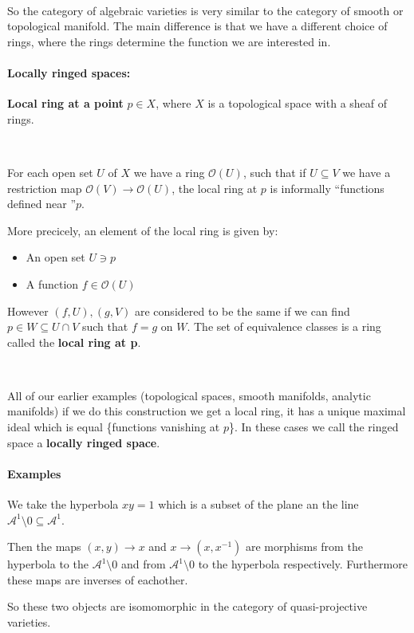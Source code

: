 \

So the category of algebraic varieties is very similar to the category of smooth or topological manifold. The main difference is that we have a different choice of rings, where the rings determine the function we are interested in.

\paragraph*{Locally ringed spaces:}
\begin{definition}
    \textbf{Local ring at a point }$p\in X$, where $X$ is a topological space with a sheaf of rings.

    \

    For each open set $U$ of $X$ we have a ring $\mathcal{O}(U)$, such that if $U\subseteq V$ we have a restriction map $\mathcal{O}(V)\rightarrow \mathcal{O}(U)$, the local ring at $p$ is informally ``functions defined near ''$p$. 

    More precicely, an element of the local ring is given by:\begin{itemize}
        \item An open set $U\ni p$
        \item A function $f\in \mathcal{O}(U)$
    \end{itemize}

    However $(f,U),(g,V)$ are considered to be the same if we can find $p\in W\subseteq U\cap V$ such that $f = g$ on $W$. The set of equivalence classes is a ring called the \textbf{local ring at p}.
\end{definition}

\

All of our earlier examples (topological spaces, smooth manifolds, analytic manifolds) if we do this construction we get a local ring, it has a unique maximal ideal which is equal \{functions vanishing at $p$\}. In these cases we call the ringed space a \textbf{locally ringed space}.

\paragraph*{Examples}

\begin{example}
    We take the hyperbola $xy = 1$ which is a subset of the plane an the line $\mathcal{A}^1\setminus 0\subseteq \mathcal{A}^1$.

    Then the maps $(x,y)\rightarrow x$ and $x\rightarrow (x,x^{-1})$ are morphisms from the hyperbola to the $\mathcal{A}^1\setminus 0$ and from $\mathcal{A}^1\setminus 0$ to the hyperbola respectively. Furthermore these maps are inverses of eachother.

    So these two objects are isomomorphic in the category of quasi-projective varieties.
\end{example}

